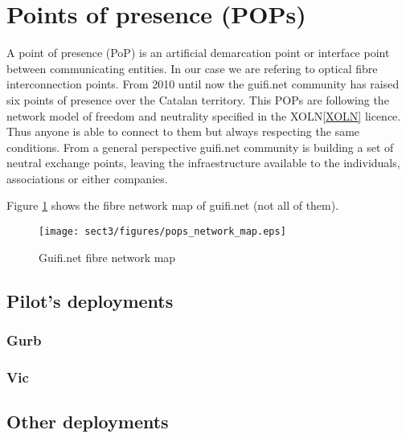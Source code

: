 \section{Points of presence (POPs)}

A point of presence (PoP) is an artificial demarcation point or interface point between communicating entities.
In our case we are refering to optical fibre interconnection points.
From 2010 until now the guifi.net community has raised six points of presence over the Catalan territory.
This POPs are following the network model of freedom and neutrality specified in the XOLN\ref{XOLN} licence.
Thus anyone is able to connect to them but always respecting the same conditions.
From a general perspective guifi.net community is building a set of neutral exchange points, leaving the
infraestructure available to the individuals, associations or either companies.

Figure \ref{fig:fibre_map} shows the fibre network map of guifi.net (not all of them).

\begin{figure}[htbp]
  \centering
  \texttt{[image: sect3/figures/pops\_network\_map.eps]} %
  \caption{Guifi.net fibre network map}
  \label{fig:fibre_map}
\end{figure}



\subsection{Pilot's deployments}

\subsubsection{Gurb}

\subsubsection{Vic}


\subsection{Other deployments}



